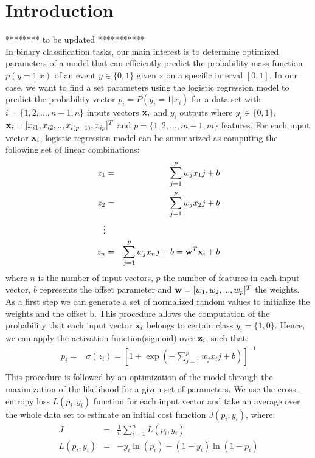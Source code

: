 \documentclass{article}
\begin{document}
\section{Introduction}
******** to be updated ***********\\
In binary classification tasks, our main interest is to determine optimized parameters of a model that can efficiently predict the probability mass function $p(y = 1 | x)$ of an event $y \in \{0,1\}$ given x on a specific interval $[0,1]$.  In our case, we want to find a set parameters using the logistic regression model to predict the probability vector $p_i=P(y_i = 1 | x_i)$ for a data set with $i=\{1, 2,..., n-1, n\}$ inputs vectors ${\bold{x}_i }$ and $y_i$ outputs where $y_i \in \{0,1\}$, $\bold{x}_i  = [ x_{i1},x_{i2},..,x_{i(p-1)},x_{ip}]^T$ and $p=\{1, 2,..., m-1, m\}$ features. For each input vector $\bold{x}_i $, logistic regression model can be summarized as computing the following set of linear combinations:
\begin{eqnarray}
z_1&=&\sum_{j=1}^{p} w_{j} x_1j +b \nonumber \\
z_2&=&\sum_{j=1}^{p} w_{j} x_2j +b \nonumber \\
\vdots \nonumber \\
z_n&=&\sum_{j=1}^{p} w_{j} x_nj +b = \bold{w}^T \bold{x}_i + b \nonumber \\
\end{eqnarray}
where $n$ is the number of input vectors, $p$ the number of features in each input vector, $b$ represents the  offset parameter and $\bold{w}=[w_1,w_2,...,w_p]^T$ the weights. As a first step we can generate a set of normalized random values to initialize the weights and the offset b. This procedure allows the computation of the probability that each input vector $\bold{x}_i$ belongs to certain class $y_i =\{1,0\}$. Hence, we can apply the activation function(sigmoid) over $\bold{z}_i$, such that:
\begin{eqnarray}
p_i=& \sigma(z_i) = \left[1+\exp(-\sum_{j=1}^{p} w_{j} x_ij +b )\right]^{-1} \nonumber \\
\end{eqnarray}
This procedure is followed by an optimization of the model through the maximization of the likelihood for a given set of parameters. We use the cross-entropy loss $L(p_i,y_i)$ function for each input vector and take an average over the whole data set to estimate an initial cost function $J(p_i,y_i)$, where:
\begin{eqnarray}
J &=& \frac{1}{n} \sum_{i=1}^{n} L(p_i,y_i) \\
L(p_i,y_i)&=& -y_i \ln(p_i) - (1-y_i) \ln(1-p_i)
\end{eqnarray}
\end{document}
